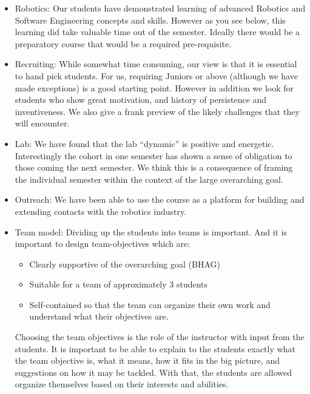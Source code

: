 \begin{itemize}
\item Robotics: Our students have demonstrated learning of advanced Robotics and Software Engineering concepts and skills. However as you see below, this learning did take valuable time out of the semester. Ideally there would be a preparatory course that would be a required pre-requisite.
\item Recruiting: While somewhat time consuming, our view is that it is essential to hand pick students. For us, requiring Juniors or above (although we have made exceptions) is a good starting point. However in addition we look for students who show great motivation, and history of persistence and inventiveness. We also give a frank preview of the likely challenges that they will encounter.
\item Lab: We have found that the lab “dynamic” is positive and energetic. Interestingly the cohort in one semester has shown a sense of obligation to those coming the next semester. We think this is a consequence of framing the individual semester within the context of the large overarching goal.
\item Outreach: We have been able to use the course as a platform for building and extending contacts with the robotics industry.
\item Team model: Dividing up the students into teams is important. And it is important to design team-objectives which are:
  \begin{itemize}
  \item Clearly supportive of the overarching goal (BHAG)
  \item Suitable for a team of approximately 3 students
  \item Self-contained so that the team can organize their own work and understand what their objectives are.
  \end{itemize}
Choosing the team objectives is the role of the instructor with input from the students. It is important to be able to explain to the students exactly what the team objective is, what it means, how it fits in the big picture, and suggestions on how it may be tackled. With that, the students are allowed organize themselves based on their interests and abilities.
\end{itemize}

